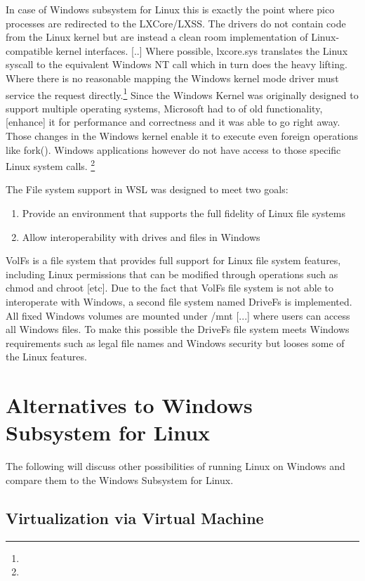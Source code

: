 \documentclass[utf8,biblatex, ngerman, english]{lni}
\begin{document}
In case of Windows subsystem for Linux this is exactly the point where pico processes are redirected to the LXCore/LXSS. \glqq The drivers do not contain code from the Linux kernel but are instead a clean room implementation of Linux-compatible kernel interfaces. [..] Where possible, lxcore.sys translates the Linux syscall to the equivalent Windows NT call which in turn does the heavy lifting. Where there is no reasonable mapping the Windows kernel mode driver must service the request directly.\glqq \footnote{} Since the Windows Kernel was originally designed to support multiple operating systems, Microsoft had to \glqq [dust] [...] of old functionality, [enhance] it for performance and correctness and it was able to go right away.\glqq \cite{PP16} Those changes in the Windows kernel enable it to execute even foreign operations like fork(). Windows applications however do not have access to those specific Linux system calls. \footnote{}

\glqq The File system support in WSL was designed to meet two goals:
\begin{enumerate}
    \item Provide an environment that supports the full fidelity of Linux file systems
    \item Allow interoperability with drives and files in Windows
\end{enumerate}\cite{WSL16}

\glqq VolFs is a file system that provides full support for Linux file system features, including Linux permissions that can be modified through operations such as chmod and chroot [etc].\glqq \cite{WSL16} Due to the fact that VolFs file system is not able to interoperate with Windows, a second file system named DriveFs is implemented. \glqq All fixed Windows volumes are mounted under /mnt [...] where users can access all Windows files.\glqq \cite{WSL16} To make this possible the DriveFs file system meets Windows requirements such as legal file names and Windows security but looses some of the Linux features.

\section{Alternatives to Windows Subsystem for Linux}
The following will discuss other possibilities of running Linux on Windows and compare them to the Windows Subsystem for Linux.

\subsection{Virtualization via Virtual Machine}
\end{document}
